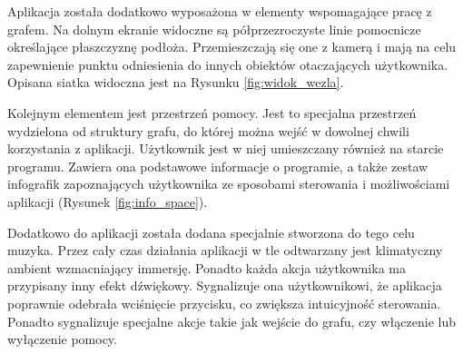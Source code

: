 
Aplikacja została dodatkowo wyposażona w elementy wspomagające pracę z grafem. Na dolnym ekranie widoczne są półprzezroczyste linie pomocnicze określające płaszczyznę podłoża. Przemieszczają się one z kamerą i mają na celu zapewnienie punktu odniesienia do innych obiektów otaczających użytkownika. Opisana siatka widoczna jest na Rysunku \ref{fig:widok_wezla}.

Kolejnym elementem jest przestrzeń pomocy. Jest to specjalna przestrzeń wydzielona od struktury grafu, do której można wejść w dowolnej chwili korzystania z aplikacji. Użytkownik jest w niej umieszczany również na starcie programu. Zawiera ona podstawowe informacje o programie, a także zestaw infografik zapoznających użytkownika ze sposobami sterowania i możliwościami aplikacji (Rysunek \ref{fig:info_space}).


Dodatkowo do aplikacji została dodana specjalnie stworzona do tego celu muzyka. Przez cały czas działania aplikacji w tle odtwarzany jest klimatyczny ambient wzmacniający immersję. Ponadto każda akcja użytkownika ma przypisany inny efekt dźwiękowy. Sygnalizuje ona użytkownikowi, że aplikacja poprawnie odebrała wciśnięcie przycisku, co zwiększa intuicyjność sterowania. Ponadto sygnalizuje specjalne akcje takie jak wejście do grafu, czy włączenie lub wyłączenie pomocy.